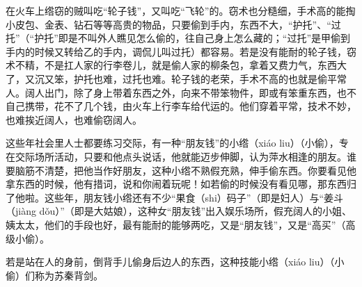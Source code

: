 \documentclass[12pt,UTF8]{ctexbook}
\begin{document}
在火车上绺窃的贼叫吃“轮子钱”，又叫吃“飞轮”的。窃术也分糙细，手术高的能掏小皮包、金表、钻石等等高贵的物品，只要偷到手内，东西不大，“护托”、“过托”（“护托”即是不叫外人瞧见怎么偷的，往自己身上怎么藏的；“过托”是甲偷到手内的时候又转给乙的手内，调侃儿叫过托）都容易。若是没有能耐的轮子钱，窃术不精，不是扛人家的行李卷儿，就是偷人家的柳条包，拿着又费力气，东西大了，又沉又笨，护托也难，过托也难。轮子钱的老荣，手术不高的也就是偷平常人。阔人出门，除了身上带着东西之外，向来不带笨物件，即或有笨重东西，也不自己携带，花不了几个钱，由火车上行李车给代运的。他们穿着平常，技术不妙，也难挨近阔人，也难偷窃阔人。

这些年社会里人士都要练习交际，有一种“朋友钱”的小绺（xiáo liu）（小偷），专在交际场所活动，只要和他点头说话，他就能迈步伸脚，认为萍水相逢的朋友。谁要脑筋不清楚，把他当作好朋友，这种小绺不熟假充熟，伸手偷东西。你要看见他拿东西的时候，他有措词，说和你闹着玩呢！如若偷的时候没有看见哪，那东西归了他啦。这些年，朋友钱小绺还有不少“果食（shi）码子”（即是妇人）与“姜斗（jiàng dǒu）”（即是大姑娘），这种女“朋友钱”出入娱乐场所，假充阔人的小姐、姨太太，他们的手段也好，最有能耐的能够两吃，又是“朋友钱”，又是“高买”（高级小偷）。

若是站在人的身前，倒背手儿偷身后边人的东西，这种技能小绺（xiáo liu）（小偷）们称为苏秦背剑。
\end{document}
